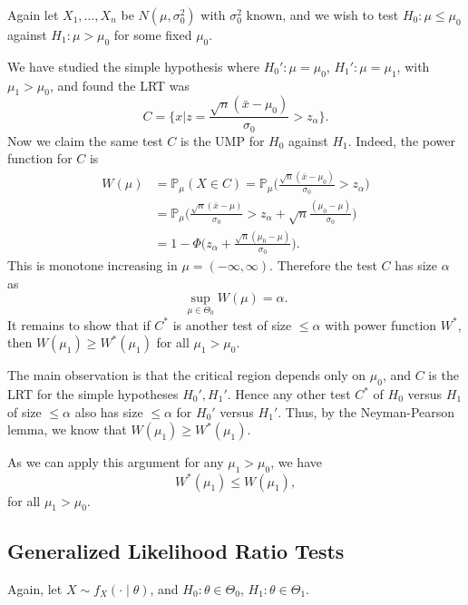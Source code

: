 \documentclass[12pt]{article}
\begin{document}
\begin{exbox}
	Again let $X_1, \ldots, X_n$ be $N(\mu, \sigma_0^2)$ with $\sigma_0^2$ known, and we wish to test $H_0 : \mu \leq \mu_0$ against $H_1 : \mu > \mu_0$ for some fixed $\mu_0$.

	We have studied the simple hypothesis where $H_0' : \mu = \mu_0$, $H_1': \mu = \mu_1$, with $\mu_1 > \mu_0$, and found the LRT was
	\[
		C = \biggl\{ x \big| z = \frac{\sqrt n (\bar x - \mu_0)}{\sigma_0} > z_{\alpha} \biggr\}
	.\]
	Now we claim the same test $C$ is the UMP for $H_0$ against $H_1$. Indeed, the power function for $C$ is 
	\begin{align*}
		W(\mu) &= \mathbb{P}_\mu(X \in C) = \mathbb{P}_\mu \biggl( \frac{\sqrt n (\bar x - \mu_0)}{\sigma_0} > z_{\alpha} \biggr) \\
		       &= \mathbb{P}_\mu \biggl( \frac{\sqrt n(\bar x - \mu)}{\sigma_0} > z_\alpha + \sqrt{n} \frac{(\mu_0 - \mu)}{\sigma_0} \biggr) \\
		       &= 1 - \Phi \biggl( z_{\alpha} + \frac{\sqrt n(\mu_0 - \mu)}{\sigma_0} \biggr).
	\end{align*}
	This is monotone increasing in $\mu = (-\infty, \infty)$. Therefore the test $C$ has size $\alpha$ as
	\[
	\sup_{\mu \in \Theta_0} W(\mu) = \alpha
	.\]
	It remains to show that if $C^{\ast}$ is another test of size $\leq \alpha$ with power function $W^{\ast}$, then $W(\mu_1) \geq W^{\ast}(\mu_1)$ for all $\mu_1 > \mu_0$.

	The main observation is that the critical region depends only on $\mu_0$, and $C$ is the LRT for the simple hypotheses $H_0', H_1'$. Hence any other test $C^{\ast}$ of $H_0$ versus $H_1$ of size $\leq \alpha$ also has size $\leq \alpha$ for $H_0'$ versus $H_1'$. Thus, by the Neyman-Pearson lemma, we know that $W(\mu_1) \geq W^{\ast}(\mu_1)$.

	As we can apply this argument for any $\mu_1 > \mu_0$, we have
	\[
	W^{\ast}(\mu_1) \leq W(\mu_1)
	,\]
	for all $\mu_1 > \mu_0$.
\end{exbox}

\subsection{Generalized Likelihood Ratio Tests}
\label{sub:generalized_likelihood_ratio_tests}

Again, let $X \sim f_X(\cdot \mid \theta)$, and $H_0 : \theta \in \Theta_0$, $H_1 : \theta \in \Theta_1$.
\end{document}
